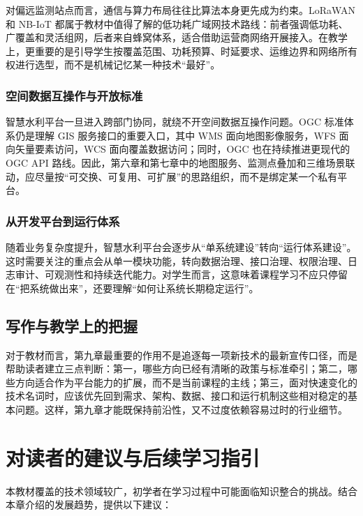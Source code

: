 对偏远监测站点而言，通信与算力布局往往比算法本身更先成为约束。LoRaWAN 和 NB-IoT 都属于教材中值得了解的低功耗广域网技术路线：前者强调低功耗、广覆盖和灵活组网，后者来自蜂窝体系，适合借助运营商网络开展接入\cite{lorawanSpec2023,nbiot3gpp2016}。在教学上，更重要的是引导学生按覆盖范围、功耗预算、时延要求、运维边界和网络所有权进行选型，而不是机械记忆某一种技术“最好”。

\subsubsection{空间数据互操作与开放标准}

智慧水利平台一旦进入跨部门协同，就绕不开空间数据互操作问题。OGC 标准体系仍是理解 GIS 服务接口的重要入口，其中 WMS 面向地图影像服务，WFS 面向矢量要素访问，WCS 面向覆盖数据访问；同时，OGC 也在持续推进更现代的 OGC API 路线\cite{ogcStandardsOverview,ogcWMS,ogcWFS,ogcWCS}。因此，第六章和第七章中的地图服务、监测点叠加和三维场景联动，应尽量按“可交换、可复用、可扩展”的思路组织，而不是绑定某一个私有平台。

\subsubsection{从开发平台到运行体系}

随着业务复杂度提升，智慧水利平台会逐步从“单系统建设”转向“运行体系建设”。这时需要关注的重点会从单一模块功能，转向数据治理、接口治理、权限治理、日志审计、可观测性和持续迭代能力。对学生而言，这意味着课程学习不应只停留在“把系统做出来”，还要理解“如何让系统长期稳定运行”。

\subsection{写作与教学上的把握}

对于教材而言，第九章最重要的作用不是追逐每一项新技术的最新宣传口径，而是帮助读者建立三点判断：第一，哪些方向已经有清晰的政策与标准牵引；第二，哪些方向适合作为平台能力的扩展，而不是当前课程的主线；第三，面对快速变化的技术名词时，应该优先回到需求、架构、数据、接口和运行机制这些相对稳定的基本问题。这样，第九章才能既保持前沿性，又不过度依赖容易过时的行业细节。

\section{对读者的建议与后续学习指引}

本教材覆盖的技术领域较广，初学者在学习过程中可能面临知识整合的挑战。结合本章介绍的发展趋势，提供以下建议：

